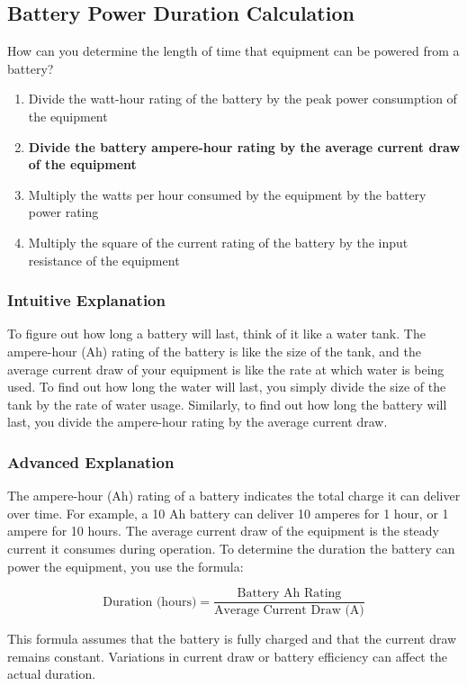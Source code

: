 \subsection{Battery Power Duration Calculation}
\label{T4A09}

\begin{tcolorbox}[colback=gray!10!white,colframe=black!75!black,title=T4A09]
How can you determine the length of time that equipment can be powered from a battery?
\begin{enumerate}[noitemsep]
    \item Divide the watt-hour rating of the battery by the peak power consumption of the equipment
    \item \textbf{Divide the battery ampere-hour rating by the average current draw of the equipment}
    \item Multiply the watts per hour consumed by the equipment by the battery power rating
    \item Multiply the square of the current rating of the battery by the input resistance of the equipment
\end{enumerate}
\end{tcolorbox}

\subsubsection*{Intuitive Explanation}
To figure out how long a battery will last, think of it like a water tank. The ampere-hour (Ah) rating of the battery is like the size of the tank, and the average current draw of your equipment is like the rate at which water is being used. To find out how long the water will last, you simply divide the size of the tank by the rate of water usage. Similarly, to find out how long the battery will last, you divide the ampere-hour rating by the average current draw.

\subsubsection*{Advanced Explanation}
The ampere-hour (Ah) rating of a battery indicates the total charge it can deliver over time. For example, a 10 Ah battery can deliver 10 amperes for 1 hour, or 1 ampere for 10 hours. The average current draw of the equipment is the steady current it consumes during operation. To determine the duration the battery can power the equipment, you use the formula:

\[
\text{Duration (hours)} = \frac{\text{Battery Ah Rating}}{\text{Average Current Draw (A)}}
\]

This formula assumes that the battery is fully charged and that the current draw remains constant. Variations in current draw or battery efficiency can affect the actual duration.